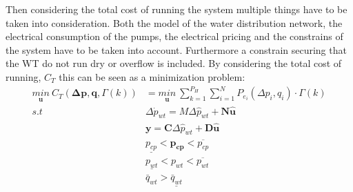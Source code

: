 Then considering the total cost of running the system multiple things have to be taken into consideration. Both the model of the water distribution network, the electrical consumption of the pumps, the electrical pricing and the constrains of the system have to be taken into account. Furthermore a constrain securing that the WT do not run dry or overflow is included. By considering the total cost of running, $C_T$ this can be seen as a minimization problem:
\begin{align}
\underset{\pmb{u}}{min} \: C_T(\pmb{\Delta{p}},\pmb{q},\Gamma(k)) &= \underset{\pmb{u}}{min} \: \sum_{k=1}^{P_H} \sum_{i=1}^{N} P_{e_{i}}(\Delta{p}_i,q_i) \cdot \Gamma(k)  \\
%
s.t \:\:\:\:\: & \Delta \dot{p}_{wt} = M \Delta \hat{p}_{wt}  + \pmb{N}\pmb{\hat{u}} \\
%
&\pmb{y} = \pmb{C} \Delta \hat{p}_{wt}  + \pmb{D}\pmb{\hat{u}} \\
%
& \underline{p_{cp}} < \pmb{p_{cp}} < \overline{p_{cp}} \\
%
& \underline{p_{wt}} < p_{wt} < \overline{p_{wt}} \\
%
& \bar{q}_{wt} > \underline{\bar{q}_{wt}}
\end{align}

